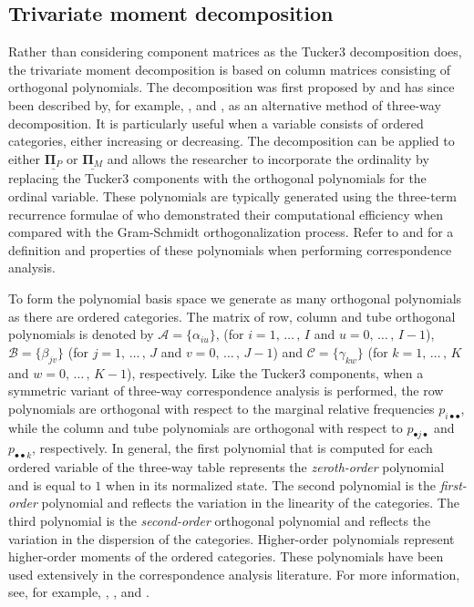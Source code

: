 \subsection{Trivariate moment decomposition}
\label{s.32}
Rather than considering component matrices as the Tucker3 decomposition does, the trivariate moment decomposition is based on column matrices consisting of orthogonal polynomials. The decomposition was first proposed by \citet[Chap. 7]{beh98phd} and has since been described by, for example, \citet{behdav98}, \citet{lomkrobeh16} and \citet[eq.~10]{lombehkro21}, as an alternative method of three-way decomposition. It is particularly useful when a variable consists of ordered categories, either increasing or decreasing. The decomposition can be applied to either $\underline{\bm{\Pi}_{P}}$ or $\underline{\bm{\Pi}_{M}}$ and allows the researcher to incorporate the ordinality by replacing the Tucker3 components with the orthogonal polynomials for the ordinal variable. These polynomials are typically generated using the three-term recurrence formulae of \citet{eme68} who demonstrated their computational efficiency when compared with the Gram-Schmidt orthogonalization process. Refer to \cite{beh97, beh98, beh98phd} and \cite{behlom21a} for a definition and properties of these polynomials when performing correspondence analysis.

To form the polynomial basis space we generate as many orthogonal polynomials as there are ordered categories. 
The matrix of row, column and tube orthogonal polynomials is denoted by  $\bm{\mathcal{A}}=\{\alpha_{iu}\}$, (for $i = 1, \, \ldots \,,\, I$ and $u = 0,\, \ldots \,,\,I - 1$), $\bm{\mathcal{B}}=\{\beta_{jv}\}$ (for $j = 1, \, \ldots \,,\, J$ and $v = 0, \, \ldots \,,\, J - 1$) and $\bm{\mathcal{C}}=\{\gamma_{kw}\}$ (for $k = 1, \, \ldots \,,\, K$ and $w = 0, \, \ldots \,,\, K - 1$), respectively. Like the Tucker3 components, when a symmetric variant of three-way correspondence analysis is performed, the row polynomials are orthogonal with respect to the marginal relative frequencies $p_{i\bullet \bullet}$, while the column and tube polynomials are orthogonal with respect to $p_{\bullet j \bullet}$ and $p_{\bullet \bullet k}$, respectively.
In general, the first polynomial that is computed for each ordered variable of the three-way table represents the \textit{zeroth-order} polynomial and is equal to $1$ when in its normalized state.
The second polynomial is the \textit{first-order} polynomial and reflects the variation in the linearity of the categories.
The third polynomial is the  \textit{second-order} orthogonal polynomial and reflects the variation in the dispersion of the categories.
Higher-order polynomials represent higher-order moments of the ordered categories. These polynomials have been used extensively in the correspondence analysis literature. For more information, see, for example, \citet{beh97,beh98}, \citet[p. 94]{behlom14}, \citet{lombehkro16} and \citet[Chap. 4]{behlom21b}.

